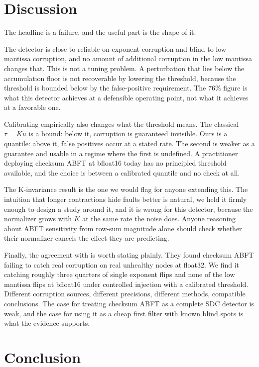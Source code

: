 \documentclass[11pt]{article}
\begin{document}
\section{Discussion}
\label{sec:discussion}

The headline is a failure, and the useful part is the shape of it.

The detector is close to reliable on exponent corruption and blind to low
mantissa corruption, and no amount of additional corruption in the low mantissa
changes that. This is not a tuning problem. A perturbation that lies below the
accumulation floor is not recoverable by lowering the threshold, because the
threshold is bounded below by the false-positive requirement. The
$76\%$ figure is what this detector achieves at a defensible operating point,
not what it achieves at a favorable one.

Calibrating empirically also changes what the threshold means. The classical
$\tau = Ku$ is a bound: below it, corruption is guaranteed invisible. Ours is a
quantile: above it, false positives occur at a stated rate. The second is
weaker as a guarantee and usable in a regime where the first is undefined. A
practitioner deploying checksum ABFT at bfloat16 today has no principled
threshold available, and the choice is between a calibrated quantile and no
check at all.

The K-invariance result is the one we would flag for anyone extending this. The
intuition that longer contractions hide faults better is natural, we held it
firmly enough to design a study around it, and it is wrong for this detector,
because the normalizer grows with $K$ at the same rate the noise does. Anyone
reasoning about ABFT sensitivity from row-sum magnitude alone should check
whether their normalizer cancels the effect they are predicting.

Finally, the agreement with \citet{ma2025understanding} is worth stating
plainly. They found checksum ABFT failing to catch real corruption on real
unhealthy nodes at float32. We find it catching roughly three quarters of
single exponent flips and none of the low mantissa flips at bfloat16 under
controlled injection with a calibrated threshold. Different corruption sources,
different precisions, different methods, compatible conclusions. The case for
treating checksum ABFT as a complete SDC detector is weak, and the case for
using it as a cheap first filter with known blind spots is what the evidence
supports.

\section{Conclusion}
\label{sec:conclusion}
\end{document}
